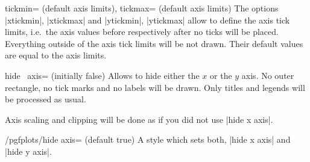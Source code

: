 \begin{pgfplotsxykeylist}{\x tickmin= (default axis limits), \x tickmax= (default axis limits)}
\label{key:xytickminmax}
The options |xtickmin|, |xtickmax| and |ytickmin|, |ytickmax| allow to define the axis tick limits, i.e.\ the axis values before respectively after no ticks will be placed.
Everything outside of the axis tick limits will be not drawn.
Their default values are equal to the axis limits.

\begin{codeexample}[]
\end{codeexample}
\end{pgfplotsxykeylist}

\begin{pgfplotsxykey}{hide \x\ axis= (initially false)}
Allows to hide either the $x$ or the $y$ axis. No outer rectangle, no tick marks and no labels will be drawn. Only titles and legends will be processed as usual.

Axis scaling and clipping will be done as if you did not use |hide x axis|.
\begin{codeexample}[]
\end{codeexample}

\begin{codeexample}[]
\end{codeexample}
\end{pgfplotsxykey}

\begin{stylekey}{/pgfplots/hide axis= (default true)}
	A style which sets both, |hide x axis| and |hide y axis|.
\end{stylekey}

